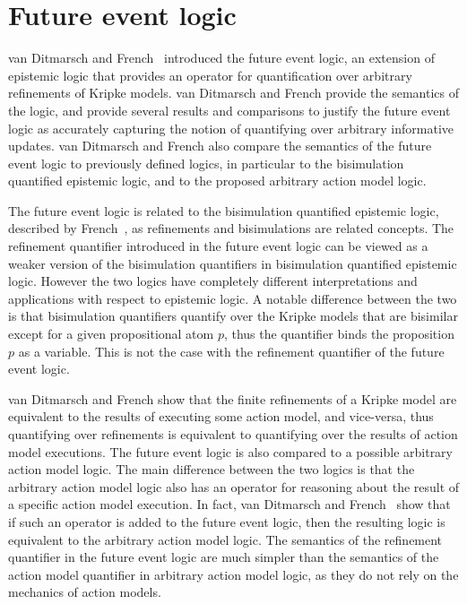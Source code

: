 \section{Future event logic}

van Ditmarsch and French~\cite{french2009simulation} introduced the future event
logic, an extension of epistemic logic that provides an operator for
quantification over arbitrary refinements of Kripke models. van Ditmarsch and
French provide the semantics of the logic, and provide several results and
comparisons to justify the future event logic as accurately capturing the notion
of quantifying over arbitrary informative updates. van Ditmarsch and French also 
compare the semantics of the future event logic to previously defined logics, in
particular to the bisimulation quantified epistemic logic, and to the proposed
arbitrary action model logic.

The future event logic is related to the bisimulation quantified epistemic
logic, described by French~\cite{french2006bisimulation}, as refinements and
bisimulations are related concepts. The refinement quantifier introduced in the
future event logic can be viewed as a weaker version of the bisimulation
quantifiers in bisimulation quantified epistemic logic. However the two logics
have completely different interpretations and applications with respect to
epistemic logic. A notable difference between the two is that bisimulation
quantifiers quantify over the Kripke models that are bisimilar except for a
given propositional atom $p$, thus the quantifier binds the proposition $p$ as a
variable. This is not the case with the refinement quantifier of the future
event logic. %

van Ditmarsch and French show that the finite refinements of a Kripke
model are equivalent to the results of executing some action model, and
vice-versa, thus quantifying over refinements is equivalent to quantifying over
the results of action model executions. The future event logic is also compared
to a possible arbitrary action model logic. The main difference between the two
logics is that the arbitrary action model logic also has an operator for
reasoning about the result of a specific action model execution. In fact, van
Ditmarsch and French~\cite{french2009simulation} show that if such an operator
is added to the future event logic, then the resulting logic is equivalent to
the arbitrary action model logic. The semantics of the refinement quantifier in
the future event logic are much simpler than the semantics of the action model
quantifier in arbitrary action model logic, as they do not rely on the mechanics
of action models.

